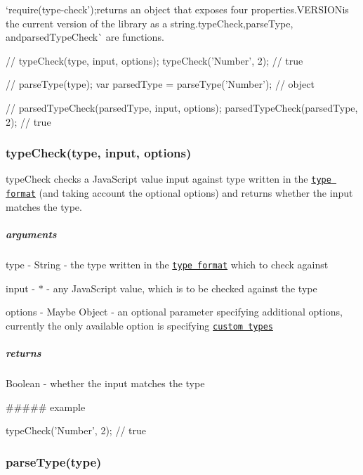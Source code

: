 `require(\textquotesingle{}type-\/check');{\ttfamily returns an object that exposes four properties.}V\+E\+R\+S\+I\+ON{\ttfamily is the current version of the library as a string.}type\+Check{\ttfamily ,}parse\+Type{\ttfamily , and}parsed\+Type\+Check\`{} are functions.


\begin{DoxyCode}
// typeCheck(type, input, options);
typeCheck('Number', 2);               // true

// parseType(type);
var parsedType = parseType('Number'); // object

// parsedTypeCheck(parsedType, input, options);
parsedTypeCheck(parsedType, 2);       // true
\end{DoxyCode}


\subsubsection*{type\+Check(type, input, options)}

{\ttfamily type\+Check} checks a Java\+Script value {\ttfamily input} against {\ttfamily type} written in the \href{#type-format}{\tt type format} (and taking account the optional {\ttfamily options}) and returns whether the {\ttfamily input} matches the {\ttfamily type}.

\subparagraph*{arguments}


\begin{DoxyItemize}
\item type -\/ {\ttfamily String} -\/ the type written in the \href{#type-format}{\tt type format} which to check against
\item input -\/ {\ttfamily $\ast$} -\/ any Java\+Script value, which is to be checked against the type
\item options -\/ {\ttfamily Maybe Object} -\/ an optional parameter specifying additional options, currently the only available option is specifying \href{#custom-types}{\tt custom types}
\end{DoxyItemize}

\subparagraph*{returns}

{\ttfamily Boolean} -\/ whether the input matches the type

\#\#\#\#\# example 
\begin{DoxyCode}
typeCheck('Number', 2); // true
\end{DoxyCode}


\subsubsection*{parse\+Type(type)}

